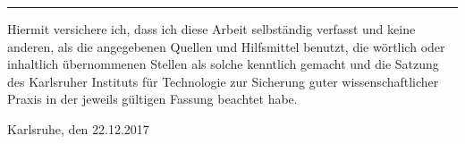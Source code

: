 \documentclass[12pt,a4paper,twoside, enabledeprecatedfontcommands]{scrartcl}
\numberwithin{equation}{section}
\begin{document}

\vspace*{0pt}\vfill

\hrule\medskip

Hiermit versichere ich, dass ich diese Arbeit selbständig verfasst und keine anderen, 
als die angegebenen Quellen und Hilfsmittel benutzt, die wörtlich oder inhaltlich 
übernommenen Stellen als solche kenntlich gemacht und die Satzung des Karlsruher 
Instituts für Technologie zur Sicherung guter wissenschaftlicher Praxis in der jeweils 
gültigen Fassung beachtet habe.

\bigskip

\noindent
Karlsruhe, den 22.12.2017


\vspace*{5cm}

\clearpage


\vspace*{0pt}\vfill
\end{document}
